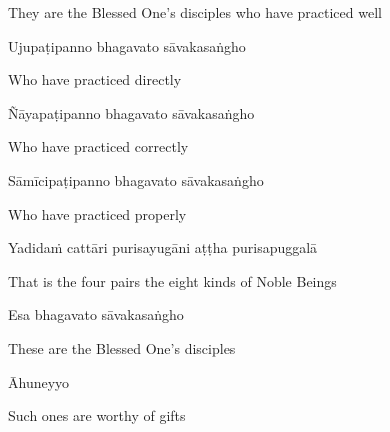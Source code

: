 \begin{english}
  They are the Blessed One's disciples who have practiced well
\end{english}

Ujupaṭipanno bhagavato sāvakasaṅgho

\begin{english}
    Who have practiced directly\makeatletter\hyperlink{endnote5-appendix}\makeatother

\end{english}

Ñāyapaṭipanno bhagavato sāvakasaṅgho

\begin{english}
    Who have practiced correctly\makeatletter\hyperlink{endnote6-appendix}\makeatother

\end{english}

Sāmīcipaṭipanno bhagavato sāvakasaṅgho

\begin{english}
  Who have practiced properly\makeatletter\hyperlink{endnote7-appendix}\makeatother

\end{english}

Yadidaṁ cattāri purisayugāni aṭṭha purisapuggalā

\begin{english}
  That is the four pairs the eight kinds of Noble Beings
\end{english}

Esa bhagavato sāvakasaṅgho

\begin{english}
  These are the Blessed One's disciples
\end{english}

Āhuneyyo

\begin{english}
  Such ones are worthy of gifts
\end{english}

